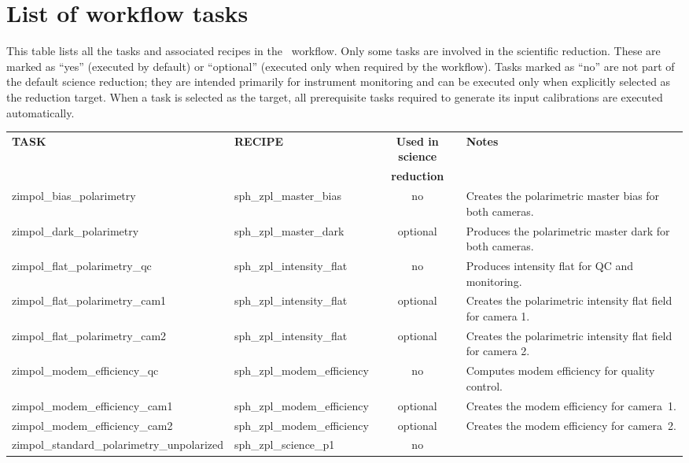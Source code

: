 \section{List of workflow tasks}

This table lists all the tasks and associated recipes in the \instname\ workflow.
Only some tasks are involved in the scientific reduction. These are marked as
``yes'' (executed by default) or ``optional'' (executed only when required by
the workflow). Tasks marked as ``no'' are not part of the default science
reduction; they are intended primarily for instrument monitoring and can be
executed only when explicitly selected as the reduction target. When a task is
selected as the target, all prerequisite tasks required to generate its input
calibrations are executed automatically.

\begin{table}[htbp]
\centering
\scriptsize
\begin{tabular}{|l|l|c|p{7cm}|}
\hline
\textbf{TASK} & \textbf{RECIPE} & \textbf{Used in science} & \textbf{Notes} \\
              &                 & \textbf{reduction} &                \\
\hline
zimpol\_bias\_polarimetry & sph\_zpl\_master\_bias & no &
Creates the polarimetric master bias for both cameras.\\
zimpol\_dark\_polarimetry & sph\_zpl\_master\_dark & optional &
Produces the polarimetric master dark for both cameras. \\
zimpol\_flat\_polarimetry\_qc & sph\_zpl\_intensity\_flat & no &
Produces intensity flat for QC and monitoring. \\
zimpol\_flat\_polarimetry\_cam1 & sph\_zpl\_intensity\_flat & optional &
Creates the polarimetric intensity flat field for camera 1. \\
zimpol\_flat\_polarimetry\_cam2 & sph\_zpl\_intensity\_flat & optional &
Creates the polarimetric intensity flat field for camera 2. \\
zimpol\_modem\_efficiency\_qc & sph\_zpl\_modem\_efficiency & no &
Computes modem efficiency for quality control. \\
zimpol\_modem\_efficiency\_cam1 & sph\_zpl\_modem\_efficiency & optional &
Creates the modem efficiency for camera~1. \\
zimpol\_modem\_efficiency\_cam2 & sph\_zpl\_modem\_efficiency & optional &
Creates the modem efficiency for camera~2. \\
zimpol\_standard\_polarimetry\_unpolarized & sph\_zpl\_science\_p1 & no &

\end{tabular}
\end{table}
